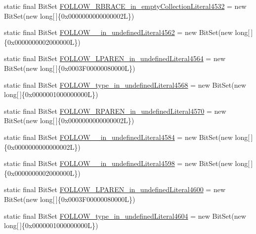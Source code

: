 \begin{DoxyCompactItemize}
\item 
static final Bit\-Set \hyperlink{classorg_1_1tzi_1_1use_1_1parser_1_1soil_1_1_soil_parser_a62d87a05b7a755f7d15dc352ae4b636e}{F\-O\-L\-L\-O\-W\-\_\-\-R\-B\-R\-A\-C\-E\-\_\-in\-\_\-empty\-Collection\-Literal4532} = new Bit\-Set(new long\mbox{[}$\,$\mbox{]}\{0x0000000000000002\-L\})
\item 
static final Bit\-Set \hyperlink{classorg_1_1tzi_1_1use_1_1parser_1_1soil_1_1_soil_parser_ad90361129d60ee5620c66a0f371f3e90}{F\-O\-L\-L\-O\-W\-\_\-\_\-in\-\_\-undefined\-Literal4562} = new Bit\-Set(new long\mbox{[}$\,$\mbox{]}\{0x0000000002000000\-L\})
\item 
static final Bit\-Set \hyperlink{classorg_1_1tzi_1_1use_1_1parser_1_1soil_1_1_soil_parser_aa63f6b570d9a037bb231361f2f3c63c3}{F\-O\-L\-L\-O\-W\-\_\-\-L\-P\-A\-R\-E\-N\-\_\-in\-\_\-undefined\-Literal4564} = new Bit\-Set(new long\mbox{[}$\,$\mbox{]}\{0x0003\-F00000080000\-L\})
\item 
static final Bit\-Set \hyperlink{classorg_1_1tzi_1_1use_1_1parser_1_1soil_1_1_soil_parser_a01de2bf906aab77f4ec6edd1c6d8c370}{F\-O\-L\-L\-O\-W\-\_\-type\-\_\-in\-\_\-undefined\-Literal4568} = new Bit\-Set(new long\mbox{[}$\,$\mbox{]}\{0x0000001000000000\-L\})
\item 
static final Bit\-Set \hyperlink{classorg_1_1tzi_1_1use_1_1parser_1_1soil_1_1_soil_parser_a030ea5721866d626bf74c10a47d1da34}{F\-O\-L\-L\-O\-W\-\_\-\-R\-P\-A\-R\-E\-N\-\_\-in\-\_\-undefined\-Literal4570} = new Bit\-Set(new long\mbox{[}$\,$\mbox{]}\{0x0000000000000002\-L\})
\item 
static final Bit\-Set \hyperlink{classorg_1_1tzi_1_1use_1_1parser_1_1soil_1_1_soil_parser_a63e15fde26f325e33de5be4471fc9bc1}{F\-O\-L\-L\-O\-W\-\_\-\_\-in\-\_\-undefined\-Literal4584} = new Bit\-Set(new long\mbox{[}$\,$\mbox{]}\{0x0000000000000002\-L\})
\item 
static final Bit\-Set \hyperlink{classorg_1_1tzi_1_1use_1_1parser_1_1soil_1_1_soil_parser_af35cac12851bf30c22cf7f5d37f3e4a2}{F\-O\-L\-L\-O\-W\-\_\-\_\-in\-\_\-undefined\-Literal4598} = new Bit\-Set(new long\mbox{[}$\,$\mbox{]}\{0x0000000002000000\-L\})
\item 
static final Bit\-Set \hyperlink{classorg_1_1tzi_1_1use_1_1parser_1_1soil_1_1_soil_parser_a55704b52a0ffe8ebf884d8ceac836634}{F\-O\-L\-L\-O\-W\-\_\-\-L\-P\-A\-R\-E\-N\-\_\-in\-\_\-undefined\-Literal4600} = new Bit\-Set(new long\mbox{[}$\,$\mbox{]}\{0x0003\-F00000080000\-L\})
\item 
static final Bit\-Set \hyperlink{classorg_1_1tzi_1_1use_1_1parser_1_1soil_1_1_soil_parser_a7603832de5cb799ac3de6cc12b49861a}{F\-O\-L\-L\-O\-W\-\_\-type\-\_\-in\-\_\-undefined\-Literal4604} = new Bit\-Set(new long\mbox{[}$\,$\mbox{]}\{0x0000001000000000\-L\})

\end{DoxyCompactItemize}
